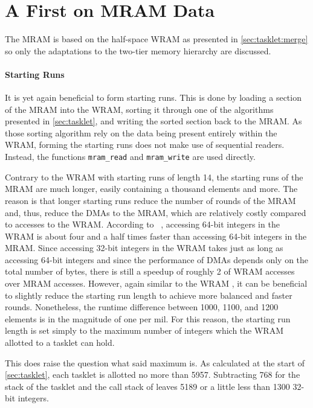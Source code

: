 \section{A First \texorpdfstring{\MS{}}{MergeSort} on MRAM Data}
\label{sec:mram:merge}

The MRAM \MS{} is based on the half-space WRAM \MS{} as presented in \cref{sec:tasklet:merge} so only the adaptations to the two-tier memory hierarchy are discussed.

\paragraph{Starting Runs}
It is yet again beneficial to form starting runs.
This is done by loading a section of the MRAM into the WRAM, sorting it through one of the algorithms presented in \cref{sec:tasklet}, and writing the sorted section back to the MRAM.
As those sorting algorithm rely on the data being present entirely within the WRAM, forming the starting runs does not make use of sequential readers.
Instead, the functions \lstinline|mram_read| and \lstinline|mram_write| are used directly.

Contrary to the WRAM \MS{} with starting runs of length 14, the starting runs of the MRAM \MS{} are much longer, easily containing a thousand elements and more.
The reason is that longer starting runs reduce the number of rounds of the MRAM \MS{} and, thus, reduce the DMAs to the MRAM, which are relatively costly compared to accesses to the WRAM.
According to \citeauthor{mutlu2022Benchmarking}~\cite[8\psq]{mutlu2022Benchmarking}, accessing 64-bit integers in the WRAM is about four and a half times faster than accessing 64-bit integers in the MRAM.
Since accessing 32-bit integers in the WRAM takes just as long as accessing 64-bit integers and since the performance of DMAs depends only on the total number of bytes, there is still a speedup of roughly 2 of WRAM accesses over MRAM accesses.
However, again similar to the WRAM \MS{}, it can be beneficial to slightly reduce the starting run length to achieve more balanced and faster rounds.
Nonetheless, the runtime difference between 1000, 1100, and 1200 elements is in the magnitude of one per mil.
For this reason, the starting run length is set simply to the maximum number of integers which the WRAM allotted to a tasklet can hold.

This does raise the question what said maximum is.
As calculated at the start of \cref{sec:tasklet}, each tasklet is allotted no more than \qty{5957}{\byte}.
Subtracting \qty{768}{\byte} for the stack of the tasklet and the call stack of \QS{} leaves \qty{5189}{\byte} or a little less than 1300 32-bit integers.
